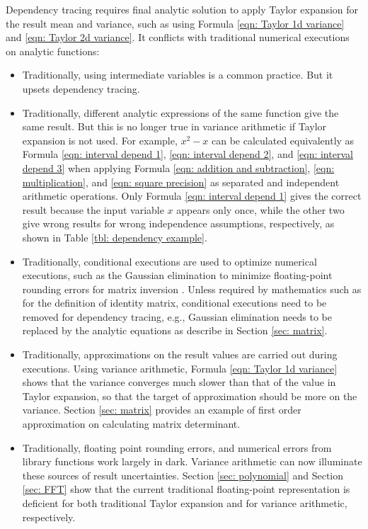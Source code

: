 \documentclass[twoside]{article}
\numberwithin{equation}{section}
\begin{document}
Dependency tracing requires final analytic solution to apply Taylor expansion for the result mean and variance, such as using Formula \eqref{eqn: Taylor 1d variance} and \eqref{eqn: Taylor 2d variance}.
It conflicts with traditional numerical executions on analytic functions:
\begin{itemize}

\item
Traditionally, using intermediate variables is a common practice.
But it upsets dependency tracing.

\item 
Traditionally, different analytic expressions of the same function give the same result.
But this is no longer true in variance arithmetic if Taylor expansion is not used.
For example, $x^2 - x$ can be calculated equivalently as Formula \eqref{eqn: interval depend 1}, \eqref{eqn: interval depend 2}, and \eqref{eqn: interval depend 3} when applying Formula \eqref{eqn: addition and subtraction}, \eqref{eqn: multiplication}, and \eqref{eqn: square precision} as separated and independent arithmetic operations.
Only Formula \eqref{eqn: interval depend 1} gives the correct result because the input variable $x$ appears only once, while the other two give wrong results for wrong independence assumptions, respectively, as shown in Table \ref{tbl: dependency example}.

\item
Traditionally, conditional executions are used to optimize numerical executions, such as the Gaussian elimination to minimize floating-point rounding errors for matrix inversion \cite{Linear_Algebra}.  
Unless required by mathematics such as for the definition of identity matrix, conditional executions need to be removed for dependency tracing, e.g., Gaussian elimination needs to be replaced by the analytic equations as describe in Section \ref{sec: matrix}.

\item 
Traditionally, approximations on the result values are carried out during executions.
Using variance arithmetic, Formula \eqref{eqn: Taylor 1d variance} shows that the variance converges much slower than that of the value in Taylor expansion, so that the target of approximation should be more on the variance.
Section \ref{sec: matrix} provides an example of first order approximation on calculating matrix determinant.

\item
Traditionally, floating point rounding errors, and numerical errors from library functions work largely in dark.
Variance arithmetic can now illuminate these sources of result uncertainties.
Section \ref{sec: polynomial} and Section \ref{sec: FFT} show that the current traditional floating-point representation is deficient for both traditional Taylor expansion and for variance arithmetic, respectively.


\end{itemize}
\end{document}
